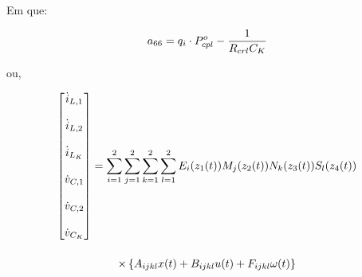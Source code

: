 Em que:

\begin{equation*}
    a_{66} = \displaystyle q_i \cdot P_{cpl}^o - \frac{1}{R_{crl} C_K}
\end{equation*} 

ou, 

\begin{gather}
    \begin{bmatrix}
    \dot{i}_{L,1} \\[12pt] \dot{i}_{L,2} \\[12pt] \dot{i}_{L_K} \\[12pt]
    \dot{v}_{C,1} \\[12pt] \dot{v}_{C,2} \\[12pt] \dot{v}_{C_K}
  \end{bmatrix} =
  \sum\limits_{i=1}^{2} \sum\limits_{j=1}^{2} \sum\limits_{k=1}^{2} \sum\limits_{l=1}^{2} E_i(z_1(t))M_j(z_2(t))N_k(z_3(t))S_l(z_4(t))
  \notag \\[12pt] \times
  \left\{
    A_{ijkl}x(t) + B_{ijkl}u(t) + F_{ijkl}\omega(t)
  \right\}
\end{gather}